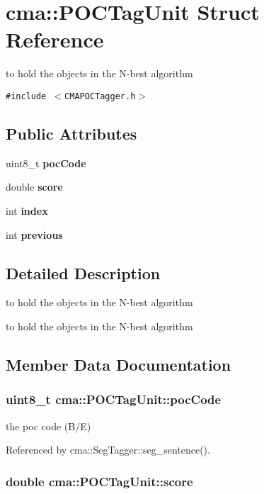 \section{cma::POCTagUnit Struct Reference}
\label{structcma_1_1POCTagUnit}
to hold the objects in the N-best algorithm  


{\tt \#include $<$CMAPOCTagger.h$>$}

\subsection*{Public Attributes}
\begin{CompactItemize}
\item 
uint8\_\-t {\bf pocCode}
\item 
double {\bf score}
\item 
int {\bf index}
\item 
int {\bf previous}
\end{CompactItemize}


\subsection{Detailed Description}
to hold the objects in the N-best algorithm 

to hold the objects in the N-best algorithm 

\subsection{Member Data Documentation}
\subsubsection{\setlength{\rightskip}{0pt plus 5cm}uint8\_\-t {\bf cma::POCTagUnit::pocCode}}\label{structcma_1_1POCTagUnit_a4a0e15baeb1ad18bbe2103284d5edb9}


the poc code (B/E) 

Referenced by cma::SegTagger::seg\_\-sentence().
\subsubsection{\setlength{\rightskip}{0pt plus 5cm}double {\bf cma::POCTagUnit::score}}\label{structcma_1_1POCTagUnit_dee6f742a3e599ee2093d224d447832f}


